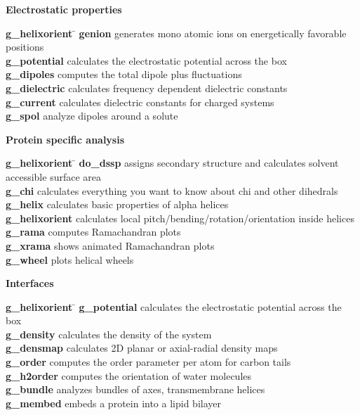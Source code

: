 \begin{description}
\item {\large\bf Electrostatic properties}
\vspace{-2ex}\begin{tabbing}
{\bf g_helixorient} \= \kill
{\bf genion} \> generates mono atomic ions on energetically favorable positions \\
{\bf g_potential} \> calculates the electrostatic potential across the box \\
{\bf g_dipoles} \> computes the total dipole plus fluctuations \\
{\bf g_dielectric} \> calculates frequency dependent dielectric constants \\
{\bf g_current} \> calculates dielectric constants for charged systems \\
{\bf g_spol} \> analyze dipoles around a solute \\
\end{tabbing}\vspace{-2ex}

\item {\large\bf Protein specific analysis}
\vspace{-2ex}\begin{tabbing}
{\bf g_helixorient} \= \kill
{\bf do_dssp} \> assigns secondary structure and calculates solvent accessible surface area \\
{\bf g_chi} \> calculates everything you want to know about chi and other dihedrals \\
{\bf g_helix} \> calculates basic properties of alpha helices \\
{\bf g_helixorient} \> calculates local pitch/bending/rotation/orientation inside helices \\
{\bf g_rama} \> computes Ramachandran plots \\
{\bf g_xrama} \> shows animated Ramachandran plots \\
{\bf g_wheel} \> plots helical wheels \\
\end{tabbing}\vspace{-2ex}

\item {\large\bf Interfaces}
\vspace{-2ex}\begin{tabbing}
{\bf g_helixorient} \= \kill
{\bf g_potential} \> calculates the electrostatic potential across the box \\
{\bf g_density} \> calculates the density of the system \\
{\bf g_densmap} \> calculates 2D planar or axial-radial density maps \\
{\bf g_order} \> computes the order parameter per atom for carbon tails \\
{\bf g_h2order} \> computes the orientation of water molecules \\
{\bf g_bundle} \> analyzes bundles of axes, {\eg} transmembrane helices \\
{\bf g_membed} \> embeds a protein into a lipid bilayer \\
\end{tabbing}\vspace{-2ex}


\end{description}
